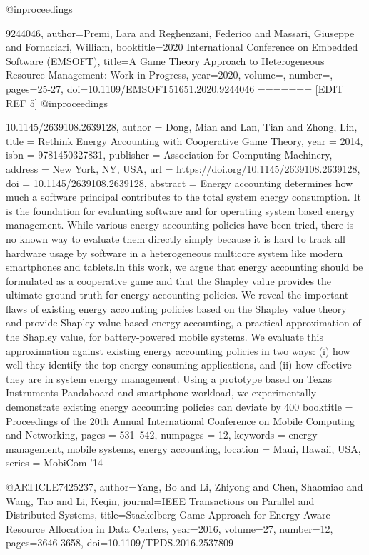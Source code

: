 @inproceedings{9244046,
author={Premi, Lara and Reghenzani, Federico and Massari, Giuseppe and Fornaciari, William},
booktitle={2020 International Conference on Embedded Software (EMSOFT)}, 
title={A Game Theory Approach to Heterogeneous Resource Management: Work-in-Progress}, 
year={2020},
volume={},
number={},
pages={25-27},
doi={10.1109/EMSOFT51651.2020.9244046}
=======
[EDIT REF 5] @inproceedings{10.1145/2639108.2639128,
author = {Dong, Mian and Lan, Tian and Zhong, Lin},
title = {Rethink Energy Accounting with Cooperative Game Theory},
year = {2014},
isbn = {9781450327831},
publisher = {Association for Computing Machinery},
address = {New York, NY, USA},
url = {https://doi.org/10.1145/2639108.2639128},
doi = {10.1145/2639108.2639128},
abstract = {Energy accounting determines how much a software principal contributes to the total system energy consumption. It is the foundation for evaluating software and for operating system based energy management. While various energy accounting policies have been tried, there is no known way to evaluate them directly simply because it is hard to track all hardware usage by software in a heterogeneous multicore system like modern smartphones and tablets.In this work, we argue that energy accounting should be formulated as a cooperative game and that the Shapley value provides the ultimate ground truth for energy accounting policies. We reveal the important flaws of existing energy accounting policies based on the Shapley value theory and provide Shapley value-based energy accounting, a practical approximation of the Shapley value, for battery-powered mobile systems. We evaluate this approximation against existing energy accounting policies in two ways: (i) how well they identify the top energy consuming applications, and (ii) how effective they are in system energy management. Using a prototype based on Texas Instruments Pandaboard and smartphone workload, we experimentally demonstrate existing energy accounting policies can deviate by 400%
booktitle = {Proceedings of the 20th Annual International Conference on Mobile Computing and Networking},
pages = {531–542},
numpages = {12},
keywords = {energy management, mobile systems, energy accounting},
location = {Maui, Hawaii, USA},
series = {MobiCom '14}
}

@ARTICLE{7425237,
author={Yang, Bo and Li, Zhiyong and Chen, Shaomiao and Wang, Tao and Li, Keqin},
journal={IEEE Transactions on Parallel and Distributed Systems}, 
title={Stackelberg Game Approach for Energy-Aware Resource Allocation in Data Centers}, 
year={2016},
volume={27},
number={12},
pages={3646-3658},
doi={10.1109/TPDS.2016.2537809}
}

}}
